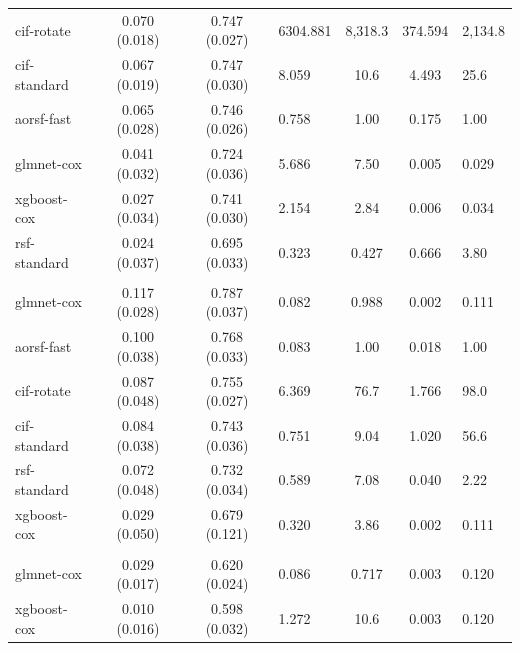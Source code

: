 \documentclass[twoside,11pt]{article}\usepackage[]{graphicx}\usepackage[]{xcolor}
\newenvironment{knitrout}{}{} %
\begin{document}
\begin{knitrout}
\begin{longtable}{lcclccl}
\hline
\hspace{1em}cif-rotate & 0.070 (0.018) & 0.747 (0.027) & 6304.881 & 8,318.3 & 374.594 & 2,134.8\\
\hspace{1em}cif-standard & 0.067 (0.019) & 0.747 (0.030) & 8.059 & 10.6 & 4.493 & 25.6\\
\hspace{1em}aorsf-fast & 0.065 (0.028) & 0.746 (0.026) & 0.758 & 1.00 & 0.175 & 1.00\\
\hspace{1em}glmnet-cox & 0.041 (0.032) & 0.724 (0.036) & 5.686 & 7.50 & 0.005 & 0.029\\
\hspace{1em}xgboost-cox & 0.027 (0.034) & 0.741 (0.030) & 2.154 & 2.84 & 0.006 & 0.034\\
\hspace{1em}rsf-standard & 0.024 (0.037) & 0.695 (0.033) & 0.323 & 0.427 & 0.666 & 3.80\\
\addlinespace[0.3em]
\hline
\multicolumn{7}{l}{\textit{\textbf{FCL; death, n = 541, p = 7}}}\\
\hline
\hspace{1em}glmnet-cox & 0.117 (0.028) & 0.787 (0.037) & 0.082 & 0.988 & 0.002 & 0.111\\
\hspace{1em}aorsf-fast & 0.100 (0.038) & 0.768 (0.033) & 0.083 & 1.00 & 0.018 & 1.00\\
\hspace{1em}cif-rotate & 0.087 (0.048) & 0.755 (0.027) & 6.369 & 76.7 & 1.766 & 98.0\\
\hspace{1em}cif-standard & 0.084 (0.038) & 0.743 (0.036) & 0.751 & 9.04 & 1.020 & 56.6\\
\hspace{1em}rsf-standard & 0.072 (0.048) & 0.732 (0.034) & 0.589 & 7.08 & 0.040 & 2.22\\
\hspace{1em}xgboost-cox & 0.029 (0.050) & 0.679 (0.121) & 0.320 & 3.86 & 0.002 & 0.111\\
\addlinespace[0.3em]
\hline
\multicolumn{7}{l}{\textit{\textbf{FCL; relapse, n = 541, p = 7}}}\\
\hline
\hspace{1em}glmnet-cox & 0.029 (0.017) & 0.620 (0.024) & 0.086 & 0.717 & 0.003 & 0.120\\
\hspace{1em}xgboost-cox & 0.010 (0.016) & 0.598 (0.032) & 1.272 & 10.6 & 0.003 & 0.120\\

\end{longtable}
\end{knitrout}
\end{document}
